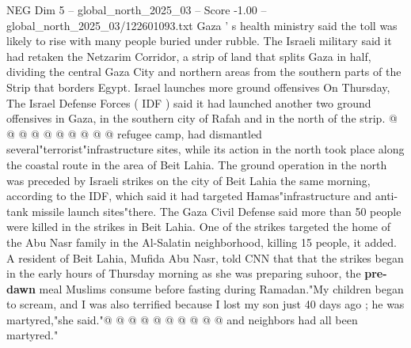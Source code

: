 \begin{textsample}{NEG Dim 5 – global\_north\_2025\_03 – Score -1.00 – global\_north\_2025\_03/122601093.txt}
Gaza ' s health ministry said the toll was likely to rise with many people buried under rubble.
The Israeli military said it had retaken the Netzarim Corridor, a strip of land that splits Gaza in half, dividing the central Gaza City and northern areas from the southern parts of the Strip that borders Egypt.
Israel launches more ground offensives On Thursday, The Israel Defense Forces ( IDF ) said it had launched another two ground offensives in Gaza, in the southern city of Rafah and in the north of the strip. @ @ @ @ @ @ @ @ @ @ refugee camp, had dismantled several"terrorist"infrastructure sites, while its action in the north took place along the coastal route in the area of Beit Lahia.
The ground operation in the north was preceded by Israeli strikes on the city of Beit Lahia the same morning, according to the IDF, which said it had targeted Hamas"infrastructure and anti-tank missile launch sites"there.
The Gaza Civil Defense said more than 50 people were killed in the strikes in Beit Lahia.
One of the strikes targeted the home of the Abu Nasr family in the Al-Salatin neighborhood, killing 15 people, it added.
A resident of Beit Lahia, Mufida Abu Nasr, told CNN that that the strikes began in the early hours of Thursday morning as she was preparing suhoor, the \textbf{pre-dawn} meal Muslims consume before fasting during Ramadan."My children began to scream, and I was also terrified because I lost my son just 40 days ago ; he was martyred,"she said."@ @ @ @ @ @ @ @ @ @ and neighbors had all been martyred."

\end{textsample}
